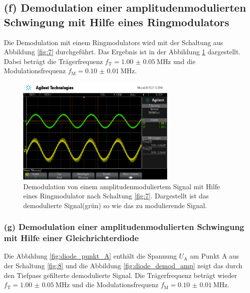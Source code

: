 \FloatBarrier
\subsection{(f) Demodulation einer amplitudenmodulierten Schwingung
mit Hilfe eines Ringmodulators}
\label{subsubsec:auswertung_f}
Die Demodulation mit einem Ringmodulators wird mit der Schaltung
aus Abbildung \ref{fig:7} durchgeführt. Das Ergebnis ist
in der Abbildung \ref{fig:amp_demod_ring} dargestellt.
Dabei beträgt die Trägerfrequenz $f_{\text{T}}=\SI{1.00(5)}{\mega\hertz}$
und die Modulationsfrequenz $f_{\text{M}}=\SI{0.10(1)}{\mega\hertz}$.


\begin{figure}
  \centering
  \includegraphics[width=0.7\textwidth]{osci/amp_demod.png}
  \caption{Demodulation von einem amplitudenmoduliertem Signal mit Hilfe eines
  Ringmodulator nach Schaltung \ref{fig:7}. Dargestellt ist das demodulierte Signal(grün) so wie das zu modulierende Signal.}
  \label{fig:amp_demod_ring}
\end{figure}




\FloatBarrier
\subsubsection{(g) Demodulation einer amplitudenmodulierten Schwingung
mit Hilfe einer Gleichrichterdiode}
\label{subsubsec:auswertung_g}
Die Abbildung \ref{fig:diode_punkt_A} enthält
die Spannung $U_{\text{A}}$ am Punkt A aus der
Schaltung \ref{fig:8} und die Abbildung \ref{fig:diode_demod_amp}
zeigt das durch den Tiefpass gefilterte demodulierte Signal.
Die Trägerfrequenz beträgt wieder $f_{\text{T}}=\SI{1.00(5)}{\mega\hertz}$
und die Modulationsfrequenz $f_{\text{M}}=\SI{0.10(1)}{\mega\hertz}$.


